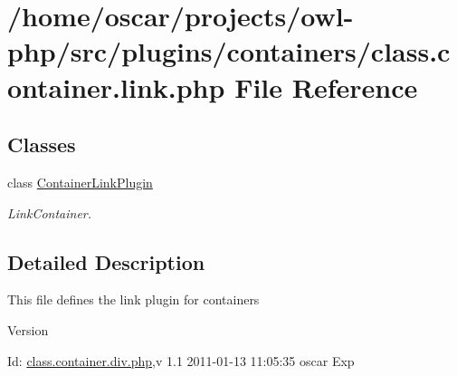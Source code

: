 \section{/home/oscar/projects/owl-\/php/src/plugins/containers/class.container.link.php File Reference}
\label{class_8container_8link_8php}
\subsection*{Classes}
\begin{DoxyCompactItemize}
\item 
class \hyperlink{classContainerLinkPlugin}{ContainerLinkPlugin}
\begin{DoxyCompactList}\small\item\em LinkContainer. \item\end{DoxyCompactList}\end{DoxyCompactItemize}


\subsection{Detailed Description}
This file defines the link plugin for containers \begin{DoxyVersion}{Version}

\end{DoxyVersion}
\begin{DoxyParagraph}{Id:}
\hyperlink{class_8container_8div_8php}{class.container.div.php},v 1.1 2011-\/01-\/13 11:05:35 oscar Exp 
\end{DoxyParagraph}
